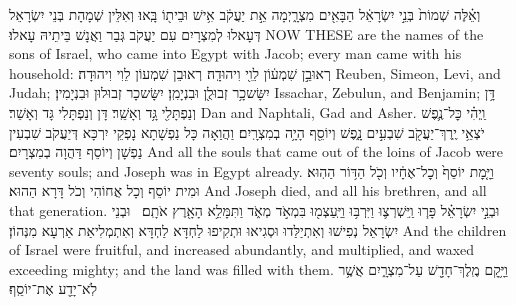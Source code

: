 {וְאֵ֗לֶּה שְׁמוֹת֙ בְּנֵ֣י יִשְׂרָאֵ֔ל הַבָּאִ֖ים מִצְרָ֑יְמָה אֵ֣ת יַעֲקֹ֔ב אִ֥ישׁ וּבֵית֖וֹ בָּֽאוּ׃
}
{וְאִלֵּין שְׁמָהָת בְּנֵי יִשְׂרָאֵל דְּעָאלוּ לְמִצְרָיִם עִם יַעֲקֹב גְּבַר וַאֲנָשׁ בֵּיתֵיהּ עָאלוּ׃}
{NOW THESE are the names of the sons of Israel, who came into Egypt with Jacob; every man came with his household:}{}
{רְאוּבֵ֣ן שִׁמְע֔וֹן לֵוִ֖י וִיהוּדָֽה׃}
{רְאוּבֵן שִׁמְעוֹן לֵוִי וִיהוּדָה׃}
{Reuben, Simeon, Levi, and Judah;}{}
{יִשָּׂשכָ֥ר זְבוּלֻ֖ן וּבִנְיָמִֽן׃}
{יִשָּׂשכָר זְבוּלוּן וּבִנְיָמִין׃}
{Issachar, Zebulun, and Benjamin;}{}
{דָּ֥ן וְנַפְתָּלִ֖י גָּ֥ד וְאָשֵֽׁר׃}
{דָּן וְנַפְתָּלִי גָּד וְאָשֵׁר׃}
{Dan and Naphtali, Gad and Asher.}{}
{וַֽיְהִ֗י כׇּל־נֶ֛פֶשׁ יֹצְאֵ֥י יֶֽרֶךְ־יַעֲקֹ֖ב שִׁבְעִ֣ים נָ֑פֶשׁ וְיוֹסֵ֖ף הָיָ֥ה בְמִצְרָֽיִם׃
}
{וַהֲוַאָה כָּל נַפְשָׁתָא נָפְקֵי יִרְכָּא דְּיַעֲקֹב שִׁבְעִין נַפְשָׁן וְיוֹסֵף דַּהֲוָה בְמִצְרָיִם׃}
{And all the souls that came out of the loins of Jacob were seventy souls; and Joseph was in Egypt already.}{}
{וַיָּ֤מׇת יוֹסֵף֙ וְכׇל־אֶחָ֔יו וְכֹ֖ל הַדּ֥וֹר הַהֽוּא׃}
{וּמִית יוֹסֵף וְכָל אֲחוֹהִי וְכֹל דָּרָא הַהוּא׃}
{And Joseph died, and all his brethren, and all that generation.}{}
{וּבְנֵ֣י יִשְׂרָאֵ֗ל פָּר֧וּ וַֽיִּשְׁרְצ֛וּ וַיִּרְבּ֥וּ וַיַּֽעַצְמ֖וּ בִּמְאֹ֣ד מְאֹ֑ד וַתִּמָּלֵ֥א הָאָ֖רֶץ אֹתָֽם׃ \petucha 
{}}
{וּבְנֵי יִשְׂרָאֵל נְפִישׁוּ וְאִתְיַלַּדוּ וּסְגִיאוּ וּתְקִיפוּ לַחְדָּא לַחְדָּא וְאִתְמְלִיאַת אַרְעָא מִנְּהוֹן׃}
{And the children of Israel were fruitful, and increased abundantly, and multiplied, and waxed exceeding mighty; and the land was filled with them.}{}
{וַיָּ֥קׇם מֶֽלֶךְ־חָדָ֖שׁ עַל־מִצְרָ֑יִם אֲשֶׁ֥ר לֹֽא־יָדַ֖ע אֶת־יוֹסֵֽף׃
}
